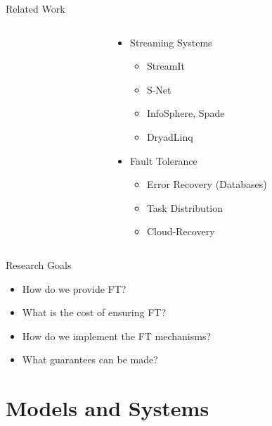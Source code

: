 \documentclass{beamer}
\begin{document}
\begin{frame}{Related Work}
\begin{columns}
\begin{column}{5cm}
\end{column}
\begin{column}{5cm}
\begin{itemize}
	\item Streaming Systems
		\begin{itemize}
			\item StreamIt \cite{thies10}
			\item S-Net \cite{pen09}
			\item InfoSphere, Spade \cite{ged08}
			\item DryadLinq \cite{yu08}
		\end{itemize}
	\item Fault Tolerance
		\begin{itemize}
			\item Error Recovery (Databases) \cite{dbrec}
			\item Task Distribution \cite{lit07}
			\item Cloud-Recovery \cite{ree06}
		\end{itemize}
\end{itemize}
\end{column}
\end{columns}
\end{frame}

\begin{frame}{Research Goals}
\begin{itemize}
	\item How do we provide FT?
	\item What is the cost of ensuring FT?
	\item How do we implement the FT mechanisms?
	\item What guarantees can be made?
\end{itemize}
\end{frame}

\section{Models and Systems}
\end{document}
